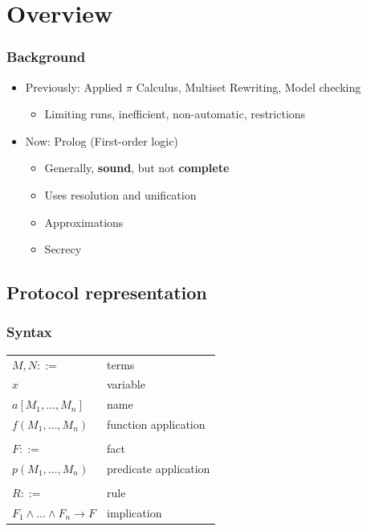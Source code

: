 \documentclass[10pt]{beamer}
\begin{document}
\section{Overview}

\begin{frame}
  \frametitle{Background}
  \begin{itemize}
    \item Previously: Applied $\pi$ Calculus, Multiset Rewriting, Model checking
    \begin{itemize}
      \item Limiting runs, inefficient, non-automatic, restrictions
    \end{itemize}
    \item Now: Prolog (First-order logic)
    \begin{itemize}
      \item Generally, \textbf{sound}, but not \textbf{complete}
      \item Uses resolution and unification
      \item Approximations
      \item Secrecy
    \end{itemize}
  \end{itemize}
\end{frame}

\subsection{Protocol representation}

\newcommand{\mytab}{\hspace{0.05\textwidth}}

\begin{frame}
  \frametitle{Syntax}
  \centering

  {\setlength{\tabcolsep}{20pt}
    \begin{tabular}{ll}
      $M, N ::=$ & terms \\
      \mytab$x$ & \mytab variable \\
      \mytab$a[M_1, \dots, M_n]$ & \mytab name \\
      \mytab$f(M_1, \dots, M_n)$ & \mytab function application \\\\

      $F ::=$ & fact \\
      \mytab$p(M_1, \dots, M_n)$ & \mytab predicate application \\\\

      $R ::=$ & rule \\
      \mytab$F_1 \land \dots \land F_n \rightarrow F$ & \mytab implication
    \end{tabular}
  }
\end{frame}

{\aauwavesbg
\begin{frame}
\end{frame}}
\end{document}

